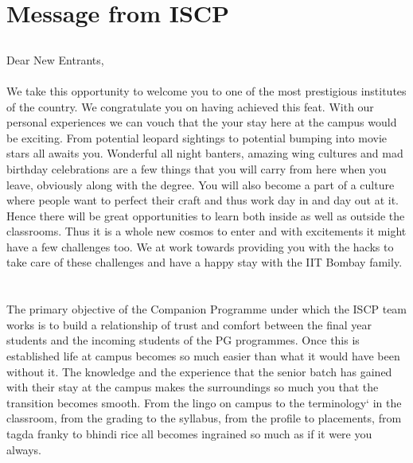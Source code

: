 \documentclass[openany]{book} %
\begin{document}
\chapter{Message from ISCP}

\section*{}

Dear New Entrants,\\
\\
We take this opportunity to welcome you to one of the most prestigious institutes of the country. We
congratulate you on having achieved this feat. With our personal experiences we can vouch that the your stay here at the campus would be exciting. From potential leopard sightings to potential bumping into movie stars all awaits you. Wonderful all night banters, amazing wing cultures and mad birthday celebrations are a few things that you will carry from here when you leave, obviously along with the degree. You will also become a part of a culture where people want to perfect their craft and thus work day in and day out at it. Hence there will be great opportunities to learn both inside as well as outside the classrooms. Thus it is a whole new cosmos to enter and with excitements it might have a few challenges too. We at \href{https://gymkhana.iitb.ac.in/~scp/scp/index.html}{\color{blue}{Institute Students Companion Program (ISCP)}}  work towards providing you with the hacks to take care of these challenges and have a happy stay with the IIT Bombay family.\\
\\
\\
The primary objective of the Companion Programme under which the ISCP team works is to build a
relationship of trust and comfort between the final year students and the incoming students of the PG
programmes. Once this is established life at campus becomes so much easier than what it would have been
without it. The knowledge and the experience that the senior batch has gained with their stay at the campus makes the surroundings so much you that the transition becomes smooth. From the lingo on campus to the terminology` in the classroom, from the grading to the syllabus, from the profile to placements, from tagda franky to bhindi rice all becomes ingrained so much as if it were you always.\\ 
\\
\\
\end{document}
